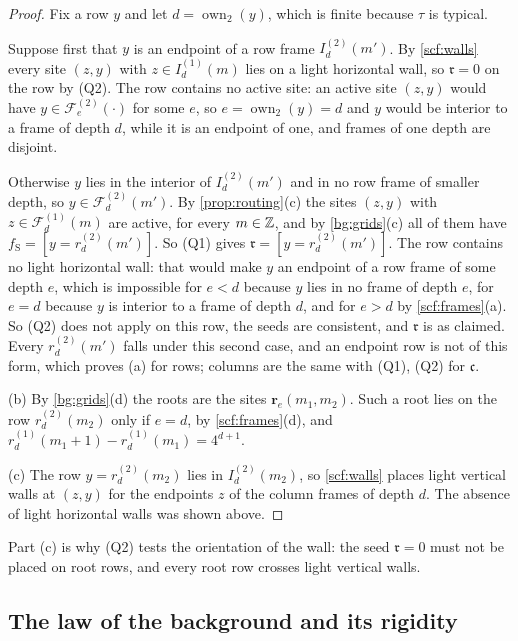 \begin{proof}
Fix a row $y$ and let $d=\operatorname{own}_2(y)$, which is finite because $\tau$ is typical.

Suppose first that $y$ is an endpoint of a row frame $I^{(2)}_d(m')$. By \cref{scf:walls} every site $(z,y)$ with $z\in I^{(1)}_d(m)$ lies on a light horizontal wall, so $\mathfrak r=0$ on the row by (Q2). The row contains no active site: an active site $(z,y)$ would have $y\in\mathcal F^{(2)}_e(\cdot)$ for some $e$, so $e=\operatorname{own}_2(y)=d$ and $y$ would be interior to a frame of depth $d$, while it is an endpoint of one, and frames of one depth are disjoint.

Otherwise $y$ lies in the interior of $I^{(2)}_d(m')$ and in no row frame of smaller depth, so $y\in\mathcal F^{(2)}_d(m')$. By \cref{prop:routing}(c) the sites $(z,y)$ with $z\in\mathcal F^{(1)}_d(m)$ are active, for every $m\in\mathbb{Z}$, and by \cref{bg:grids}(c) all of them have $f_{\mathrm S}=[y=r^{(2)}_d(m')]$. So (Q1) gives $\mathfrak r=[y=r^{(2)}_d(m')]$. The row contains no light horizontal wall: that would make $y$ an endpoint of a row frame of some depth $e$, which is impossible for $e<d$ because $y$ lies in no frame of depth $e$, for $e=d$ because $y$ is interior to a frame of depth $d$, and for $e>d$ by \cref{scf:frames}(a). So (Q2) does not apply on this row, the seeds are consistent, and $\mathfrak r$ is as claimed. Every $r^{(2)}_d(m')$ falls under this second case, and an endpoint row is not of this form, which proves (a) for rows; columns are the same with (Q1), (Q2) for $\mathfrak c$.

(b) By \cref{bg:grids}(d) the roots are the sites $\mathbf r_e(m_1,m_2)$. Such a root lies on the row $r^{(2)}_d(m_2)$ only if $e=d$, by \cref{scf:frames}(d), and $r^{(1)}_d(m_1+1)-r^{(1)}_d(m_1)=4^{d+1}$.

(c) The row $y=r^{(2)}_d(m_2)$ lies in $I^{(2)}_d(m_2)$, so \cref{scf:walls} places light vertical walls at $(z,y)$ for the endpoints $z$ of the column frames of depth $d$. The absence of light horizontal walls was shown above.
\end{proof}

Part (c) is why (Q2) tests the orientation of the wall: the seed $\mathfrak r=0$ must not be placed on root rows, and every root row crosses light vertical walls.

\subsection{The law of the background and its rigidity}

